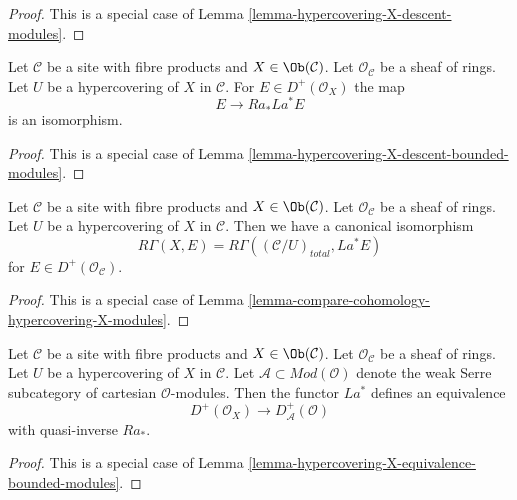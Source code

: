 \begin{proof}
This is a special case of
Lemma \ref{lemma-hypercovering-X-descent-modules}.
\end{proof}

\begin{lemma}
\label{lemma-hypercovering-X-simple-descent-bounded-modules}
Let $\mathcal{C}$ be a site with fibre products and $X \in \Ob(\mathcal{C})$.
Let $\mathcal{O}_\mathcal{C}$ be a sheaf of rings.
Let $U$ be a hypercovering of $X$ in $\mathcal{C}$. For
$E \in D^+(\mathcal{O}_X)$ the map
$$
E \longrightarrow Ra_*La^*E
$$
is an isomorphism.
\end{lemma}

\begin{proof}
This is a special case of
Lemma \ref{lemma-hypercovering-X-descent-bounded-modules}.
\end{proof}

\begin{lemma}
\label{lemma-compare-cohomology-hypercovering-X-simple-modules}
Let $\mathcal{C}$ be a site with fibre products and $X \in \Ob(\mathcal{C})$.
Let $\mathcal{O}_\mathcal{C}$ be a sheaf of rings.
Let $U$ be a hypercovering of $X$ in $\mathcal{C}$.
Then we have a canonical isomorphism
$$
R\Gamma(X, E) = R\Gamma((\mathcal{C}/U)_{total}, La^*E)
$$
for $E \in D^+(\mathcal{O}_\mathcal{C})$.
\end{lemma}

\begin{proof}
This is a special case of
Lemma \ref{lemma-compare-cohomology-hypercovering-X-modules}.
\end{proof}

\begin{lemma}
\label{lemma-hypercovering-X-simple-equivalence-bounded-modules}
Let $\mathcal{C}$ be a site with fibre products and $X \in \Ob(\mathcal{C})$.
Let $\mathcal{O}_\mathcal{C}$ be a sheaf of rings.
Let $U$ be a hypercovering of $X$ in $\mathcal{C}$.
Let $\mathcal{A} \subset \textit{Mod}(\mathcal{O})$
denote the weak Serre subcategory of cartesian $\mathcal{O}$-modules.
Then the functor $La^*$ defines an equivalence
$$
D^+(\mathcal{O}_X) \longrightarrow D_\mathcal{A}^+(\mathcal{O})
$$
with quasi-inverse $Ra_*$.
\end{lemma}

\begin{proof}
This is a special case of
Lemma \ref{lemma-hypercovering-X-equivalence-bounded-modules}.
\end{proof}







